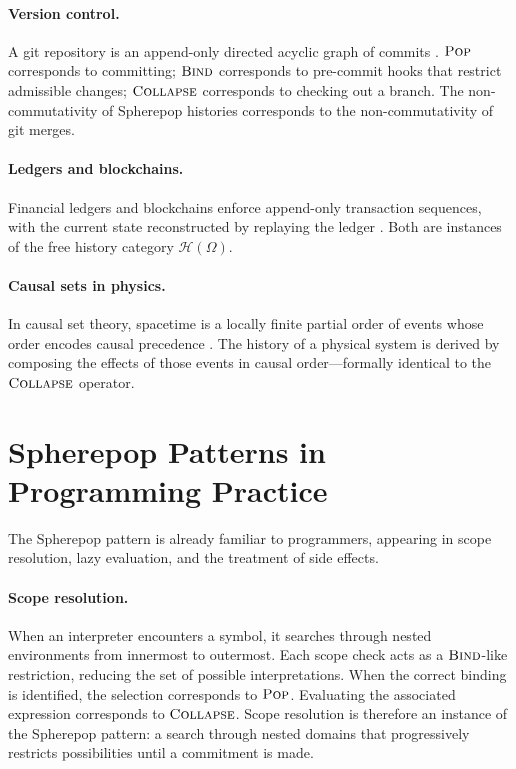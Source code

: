 \documentclass[12pt]{article}
\newcommand{\Pop}{\operatorname{\textsc{Pop}}}
\newcommand{\Bind}{\operatorname{\textsc{Bind}}}
\newcommand{\Collapse}{\operatorname{\textsc{Collapse}}}
\newcommand{\History}{\mathcal{H}}
\newcommand{\Option}{\Omega}
\begin{document}
\paragraph{Version control.} A git repository is an append-only directed acyclic graph of commits \cite{chacon2014}. $\Pop$ corresponds to committing; $\Bind$ corresponds to pre-commit hooks that restrict admissible changes; $\Collapse$ corresponds to checking out a branch. The non-commutativity of Spherepop histories corresponds to the non-commutativity of git merges.

\paragraph{Ledgers and blockchains.} Financial ledgers and blockchains enforce append-only transaction sequences, with the current state reconstructed by replaying the ledger \cite{kleppmann2017}. Both are instances of the free history category $\History(\Option)$.

\paragraph{Causal sets in physics.} In causal set theory, spacetime is a locally finite partial order of events whose order encodes causal precedence \cite{brightwell1991}. The history of a physical system is derived by composing the effects of those events in causal order---formally identical to the $\Collapse$ operator.

\section{Spherepop Patterns in Programming Practice}
\label{sec:programming}

The Spherepop pattern is already familiar to programmers, appearing in scope resolution, lazy evaluation, and the treatment of side effects.

\paragraph{Scope resolution.} When an interpreter encounters a symbol, it searches through nested environments from innermost to outermost. Each scope check acts as a $\Bind$-like restriction, reducing the set of possible interpretations. When the correct binding is identified, the selection corresponds to $\Pop$. Evaluating the associated expression corresponds to $\Collapse$. Scope resolution is therefore an instance of the Spherepop pattern: a search through nested domains that progressively restricts possibilities until a commitment is made.
\end{document}
